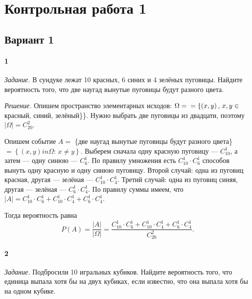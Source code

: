 \chapter*{Контрольная работа 1}

\section*{Вариант 1}

\subsubsection*{1}

\textit{Задание.} В сундуке лежат 10 красных, 6 синих и 4 зелёных пуговицы.
Найдите вероятность того, что две наугад вынутые пуговицы будут разного цвета.

\textit{Решение.}
Опишем пространство элементарных исходов: $ \Omega = \\ = \left\{ \left( x, y \right), \, x, y \in \right.$ красный, синий, зелёный\}\}.
Нужно выбрать две пуговицы из двадцати, поэтому $ \left| \Omega \right| = C_{20}^2$.

Опишем событие $A =$ \{две наугад вынутые пуговицы будут разного цвета\} $= \left\{ \left( x, y \right) in \Omega: \, x \neq y \right\} $.
Выберем сначала одну красную пуговицу --- $C_{10}^1$, а затем --- одну синюю --- $C_6^1$.
По правилу умножения есть $C_{10}^1 \cdot C_6^1$ способов вынуть одну красную и одну синюю пуговицу.
Второй случай: одна из пуговиц красная, другая --- зелёная --- $C_{10}^1 \cdot C_4^1$.
Третий случай: одна из пуговиц синяя, другая --- зелёная --- $C_6^1 \cdot C_4^1$.
По правилу суммы имеем, что $ \left| A \right| = C_{10}^1 \cdot C_6^1 + C_{10}^1 \cdot C_4^1 + C_6^1 \cdot C_4^1$.

Тогда вероятность равна
$$P \left( A \right) =
\frac{ \left| A \right| }{ \left| \Omega \right| } =
\frac{C_{10}^1 \cdot C_6^1 + C_{10}^1 \cdot C_4^1 + C_6^1 \cdot C_4^1}{C_{20}^2}.$$

\subsubsection*{2}

\textit{Задание.} Подбросили 10 игральных кубиков.
Найдите вероятность того, что единица выпала хотя бы на двух кубиках, если известно, что она выпала хотя бы на одном кубике.

